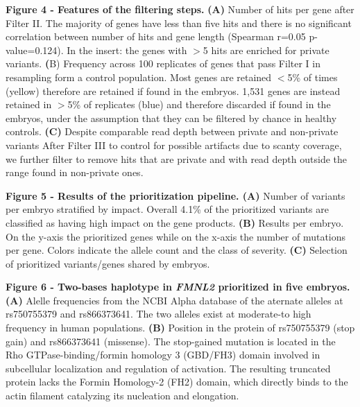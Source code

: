 \textbf{Figure 4 - Features of the filtering steps.} \textbf{(A)} Number of hits per gene after Filter II. The majority of genes have less than five hits and there is no significant correlation between number of hits and gene length (Spearman r=0.05 p-value=0.124). In the insert: the genes with $>$5 hits are enriched for private variants. \textbf(B) Frequency across 100 replicates of genes that pass Filter I in resampling form a control population. Most genes are retained $<$5\% of times (yellow) therefore are retained if found in the embryos. 1,531 genes are instead retained in $>$5\% of replicates (blue) and therefore discarded if found in the embryos, under the assumption that they can be filtered by chance in healthy controls. \textbf{(C)} Despite comparable read depth between private and non-private variants After Filter III to control for possible artifacts due to scanty coverage, we further filter to remove hits that are private and with read depth outside the range found in non-private ones.

\textbf{Figure 5 - Results of the prioritization pipeline. (A)} Number of variants per embryo stratified by impact. Overall 4.1\% of the prioritized variants are classified as having high impact on the gene products. \textbf{(B)} Results per embryo. On the y-axis the prioritized genes while on the x-axis the number of mutations per gene. Colors indicate the allele count and the class of severity. \textbf{(C)} Selection of prioritized variants/genes shared by embryos.


\textbf{Figure 6 - Two-bases haplotype in \textit{FMNL2} prioritized in five embryos. (A)} Alelle frequencies from the NCBI Alpha database of the aternate alleles at rs750755379 and rs866373641. The two alleles exist at moderate-to high frequency in human populations. \textbf{(B)} Position in the protein of rs750755379 (stop gain) and rs866373641 (missense). The stop-gained mutation is located in the Rho GTPase-binding/formin homology 3 (GBD/FH3) domain involved in subcellular localization and regulation of activation. The resulting truncated protein lacks the Formin Homology-2 (FH2) domain, which directly binds to the actin filament catalyzing its nucleation and elongation.